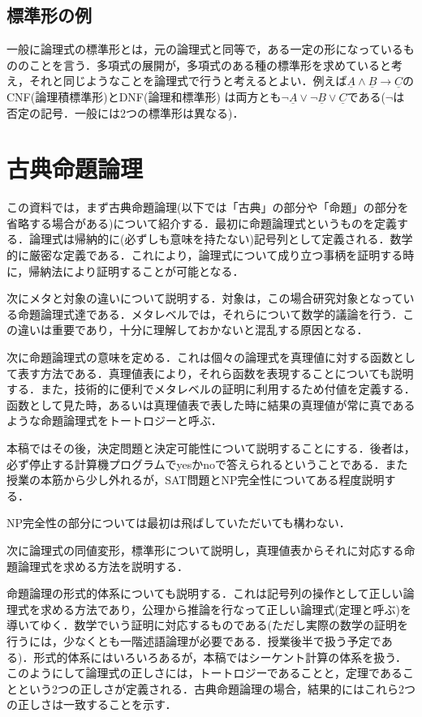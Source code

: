 \documentclass{ltjsarticle}
\theoremstyle{mystyle1}
\theoremstyle{mystyle3}
\theoremstyle{mystyle2}
\newcommand{\uA}{\underline{A}}
\newcommand{\uB}{\underline{B}}
\newcommand{\uC}{\underline{C}}
\begin{document}
\subsection{標準形の例}
一般に論理式の標準形とは，元の論理式と同等で，ある一定の形になっているもののことを言う．多項式の展開が，多項式のある種の標準形を求めていると考え，それと同じようなことを論理式で行うと考えるとよい．例えば$\uA\wedge\uB\to\uC$のCNF(論理積標準形)とDNF(論理和標準形) は両方とも$\neg\uA\vee\neg\uB\vee\uC$である($\neg$は否定の記号．一般には2つの標準形は異なる)．
\section{古典命題論理}
この資料では，まず古典命題論理(以下では「古典」の部分や「命題」の部分を省略する場合がある)について紹介する．最初に命題論理式というものを定義する．論理式は帰納的に(必ずしも意味を持たない)記号列として定義される．数学的に厳密な定義である．これにより，論理式について成り立つ事柄を証明する時に，帰納法により証明することが可能となる．

次にメタと対象の違いについて説明する．対象は，この場合研究対象となっている命題論理式達である．メタレベルでは，それらについて数学的議論を行う．この違いは重要であり，十分に理解しておかないと混乱する原因となる．

次に命題論理式の意味を定める．これは個々の論理式を真理値に対する函数として表す方法である．真理値表により，それら函数を表現することについても説明する．また，技術的に便利でメタレベルの証明に利用するため付値を定義する．函数として見た時，あるいは真理値表で表した時に結果の真理値が常に真であるような命題論理式をトートロジーと呼ぶ．

本稿ではその後，決定問題と決定可能性について説明することにする．後者は，必ず停止する計算機プログラムでyesかnoで答えられるということである．また授業の本筋から少し外れるが，SAT問題とNP完全性についてある程度説明する．

NP完全性の部分については最初は飛ばしていただいても構わない．

次に論理式の同値変形，標準形について説明し，真理値表からそれに対応する命題論理式を求める方法を説明する．

命題論理の形式的体系についても説明する．これは記号列の操作として正しい論理式を求める方法であり，公理から推論を行なって正しい論理式(定理と呼ぶ)を導いてゆく．数学でいう証明に対応するものである(ただし実際の数学の証明を行うには，少なくとも一階述語論理が必要である．授業後半で扱う予定である)．形式的体系にはいろいろあるが，本稿ではシーケント計算の体系を扱う．このようにして論理式の正しさには，トートロジーであることと，定理であることという2つの正しさが定義される．古典命題論理の場合，結果的にはこれら2つの正しさは一致することを示す．
\end{document}
